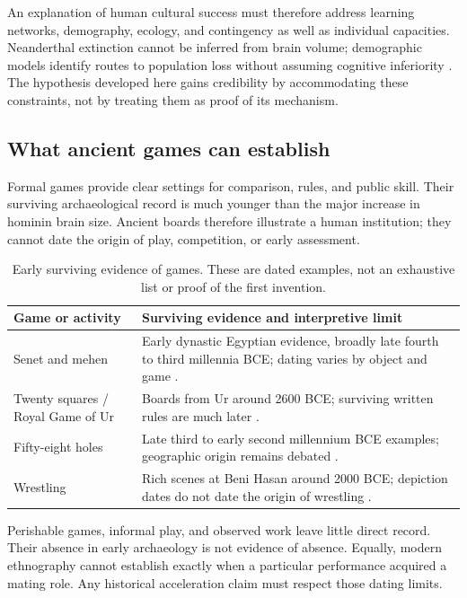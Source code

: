 \documentclass[10pt,twocolumn,letterpaper]{article}
\begin{document}
An explanation of human cultural success must therefore address learning networks, demography, ecology, and contingency as well as individual capacities. Neanderthal extinction cannot be inferred from brain volume; demographic models identify routes to population loss without assuming cognitive inferiority \citep{vaesen}. The hypothesis developed here gains credibility by accommodating these constraints, not by treating them as proof of its mechanism.

\subsection{What ancient games can establish}
Formal games provide clear settings for comparison, rules, and public skill. Their surviving archaeological record is much younger than the major increase in hominin brain size. Ancient boards therefore illustrate a human institution; they cannot date the origin of play, competition, or early assessment.

\begin{table}[t]
\caption{Early surviving evidence of games. These are dated examples, not an exhaustive list or proof of the first invention.}
\label{tab:games}
\footnotesize\begin{tabularx}{\columnwidth}{L{.31\columnwidth}Y}
\toprule
Game or activity & Surviving evidence and interpretive limit\\
\midrule
Senet and mehen & Early dynastic Egyptian evidence, broadly late fourth to third millennia BCE; dating varies by object and game \citep{crist}.\\
Twenty squares / Royal Game of Ur & Boards from Ur around 2600 BCE; surviving written rules are much later \citep{ur}.\\
Fifty-eight holes & Late third to early second millennium BCE examples; geographic origin remains debated \citep{holes}.\\
Wrestling & Rich scenes at Beni Hasan around 2000 BCE; depiction dates do not date the origin of wrestling \citep{beni}.\\
\bottomrule
\end{tabularx}
\end{table}

Perishable games, informal play, and observed work leave little direct record. Their absence in early archaeology is not evidence of absence. Equally, modern ethnography cannot establish exactly when a particular performance acquired a mating role. Any historical acceleration claim must respect those dating limits.
\end{document}
